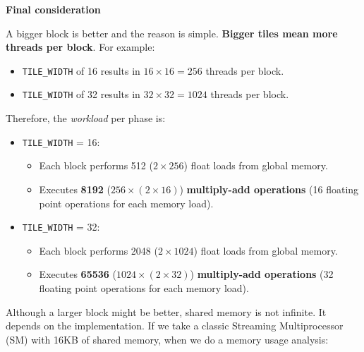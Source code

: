 \highspace
\begin{flushleft}
    \textcolor{Green3}{ \textbf{Final consideration}}
\end{flushleft}
A bigger block is better and the reason is simple. \textbf{Bigger tiles mean more threads per block}. For example:
\begin{itemize}
    \item \texttt{TILE\_WIDTH} of 16 results in $16 \times 16 = 256$ threads per block.
    \item \texttt{TILE\_WIDTH} of 32 results in $32 \times 32 = 1024$ threads per block.
\end{itemize}
Therefore, the \emph{workload} per phase is:
\begin{itemize}
    \item \texttt{TILE\_WIDTH} = 16:
    \begin{itemize}
        \item Each block performs 512 ($2 \times 256$) float loads from global memory.
        \item Executes \textbf{8192} ($256 \times \left(2 \times 16\right)$) \textbf{multiply-add operations} (16 floating point operations for each memory load).
    \end{itemize}

    \item \texttt{TILE\_WIDTH} = 32:
    \begin{itemize}
        \item Each block performs 2048 ($2 \times 1024$) float loads from global memory.
        \item Executes \textbf{65536} ($1024 \times (2 \times 32)$) \textbf{multiply-add operations} (32 floating point operations for each memory load).
    \end{itemize}
\end{itemize}
Although a larger block might be better, shared memory is not infinite. It depends on the implementation. If we take a classic Streaming Multiprocessor (SM) with 16KB of shared memory, when we do a memory usage analysis:
